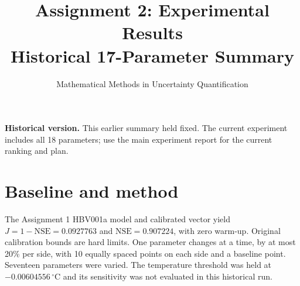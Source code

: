 \documentclass[10pt,a4paper]{article}
\title{Assignment 2: Experimental Results\\Historical 17-Parameter Summary}
\author{Mathematical Methods in Uncertainty Quantification}
\date{}
\newcommand{\param}[1]{\texttt{\detokenize{#1}}}
\begin{document}
\maketitle
\textbf{Historical version.} This earlier summary held \param{snw_att} fixed. The current experiment includes all 18 parameters; use the main experiment report for the current ranking and plan.
\section{Baseline and method}
The Assignment 1 HBV001a model and calibrated vector yield \(J=1-\mathrm{NSE}=0.0927763\) and \(\mathrm{NSE}=0.907224\), with zero warm-up. Original calibration bounds are hard limits. One parameter changes at a time, by at most 20\% per side, with 10 equally spaced points on each side and a baseline point. Seventeen parameters were varied. The temperature threshold was held at $-0.00604556\,^\circ\mathrm C$ and its sensitivity was not evaluated in this historical run.
\end{document}
